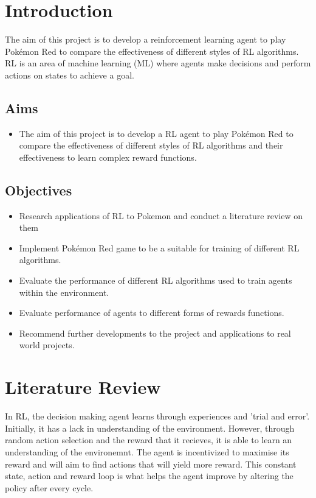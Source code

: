 \documentclass{surrey_disso_style}
\begin{document}
\newpage
\section{Introduction}
The aim of this project is to develop a reinforcement learning agent to play Pokémon Red to compare the effectiveness of different styles of RL algorithms. RL is an area of machine learning (ML) where agents make decisions and perform actions on states to achieve a goal. 

\subsection{Aims}

\begin{itemize}
   \item [\ding{54}] The aim of this project is to develop a RL agent to play Pokémon Red to compare the effectiveness of different styles of RL algorithms and their effectiveness to learn complex reward functions.
\end{itemize}

\subsection{Objectives}

\begin{itemize}
   \item [\ding{169}] Research applications of RL to Pokemon and conduct a literature review on them
   \item [\ding{169}] Implement Pokémon Red game to be a suitable for training of different RL algorithms.
   \item [\ding{169}] Evaluate the performance of different RL algorithms used to train agents within the environment.
   \item [\ding{169}] Evaluate performance of agents to different forms of rewards functions.
   \item [\ding{169}] Recommend further developments to the project and applications to real world projects.
\end{itemize}

\section{Literature Review}
In RL, the decision making agent learns through experiences and 'trial and error'. Initially, it has a lack in understanding of the 
environment. However, through random action selection and the reward that it recieves, it is able to learn an understanding of the 
environemnt. The agent is incentivized to maximise its reward and will aim to find actions that will yield more reward. This constant
 state, action and reward loop is what helps the agent improve by altering the policy after every cycle. 
\par
\end{document}
